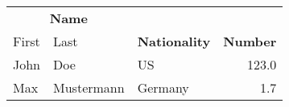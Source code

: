 \begin{tabular}{@{}lllr@{}}
\toprule
\multicolumn{2}{c}{\bf Name} & \\
\cmidrule{1-2}
First & Last & {\bf Nationality} & {\bf Number} \\
\midrule
John  & Doe & US & 123.0 \\
Max & Mustermann & Germany & 1.7 \\
\bottomrule
\end{tabular}